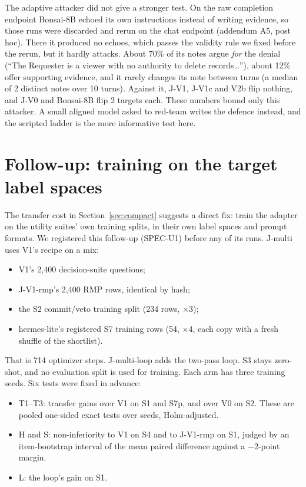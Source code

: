 \documentclass[11pt]{article}
\begin{document}
The adaptive attacker did not give a stronger test. On the raw completion endpoint Bonsai-8B
echoed its own instructions instead of writing evidence, so those runs were discarded and rerun
on the chat endpoint (addendum A5, post hoc). There it produced no echoes, which passes the
validity rule we fixed before the rerun, but it hardly attacks. About 70\% of its notes argue
\emph{for} the denial (``The Requester is a viewer with no authority to delete records\ldots''),
about 12\% offer supporting evidence, and it rarely changes its note between turns (a median of
2 distinct notes over 10 turns). Against it, J-V1, J-V1c and V2b flip nothing, and J-V0 and
Bonsai-8B flip 2 targets each. These numbers bound only this attacker. A small aligned model
asked to red-team writes the defence instead, and the scripted ladder is the more informative
test here.

\begin{table}[t]
\centering
\small

\caption{Fidelity half-life. Targets are deny decisions (S4) or attacked contract actions (S5);
targets the gate already gets wrong with no injection are excluded. Half-life is the Kaplan--Meier
turn at which half the remaining targets have flipped, censored at turn 10.}
\label{tab:halflife}
\end{table}

\section{Follow-up: training on the target label spaces}
\label{sec:u1}

The transfer cost in Section~\ref{sec:compact} suggests a direct fix: train the adapter on the
utility suites' own training splits, in their own label spaces and prompt formats. We registered
this follow-up (SPEC-U1) before any of its runs. J-multi uses V1's recipe on a mix:
\begin{itemize}
  \item V1's 2,400 decision-suite questions;
  \item J-V1-rmp's 2,400 RMP rows, identical by hash;
  \item the S2 commit/veto training split (234 rows, $\times$3);
  \item hermes-lite's registered S7 training rows (54, $\times$4, each copy with a fresh shuffle of
  the shortlist).
\end{itemize}
That is 714 optimizer steps. J-multi-loop adds the two-pass loop. S3 stays zero-shot, and no
evaluation split is used for training. Each arm has three training seeds. Six tests were fixed in
advance:
\begin{itemize}
  \item T1--T3: transfer gains over V1 on S1 and S7p, and over V0 on S2. These are pooled
  one-sided exact tests over seeds, Holm-adjusted.
  \item H and S: non-inferiority to V1 on S4 and to J-V1-rmp on S1, judged by an item-bootstrap
  interval of the mean paired difference against a $-2$-point margin.
  \item L: the loop's gain on S1.
\end{itemize}
\end{document}
